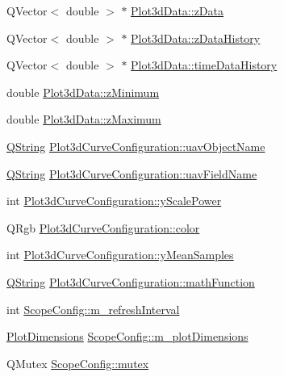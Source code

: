 \begin{DoxyCompactItemize}
\item 
\-Q\-Vector$<$ double $>$ $\ast$ \hyperlink{group___scope_plugin_gad5607d9145f51871817c4094cd1ba250}{\-Plot3d\-Data\-::z\-Data}
\item 
\-Q\-Vector$<$ double $>$ $\ast$ \hyperlink{group___scope_plugin_gab1e0ead20c4c64f78a8dafc2ae101710}{\-Plot3d\-Data\-::z\-Data\-History}
\item 
\-Q\-Vector$<$ double $>$ $\ast$ \hyperlink{group___scope_plugin_ga92914eba20188371aeb3ad365c01acc4}{\-Plot3d\-Data\-::time\-Data\-History}
\item 
double \hyperlink{group___scope_plugin_ga0938aa53ec304cabf25b8294dde0a5b0}{\-Plot3d\-Data\-::z\-Minimum}
\item 
double \hyperlink{group___scope_plugin_ga1ad4417e8b0fb7035d1f4c85191812a0}{\-Plot3d\-Data\-::z\-Maximum}
\item 
\hyperlink{group___u_a_v_objects_plugin_gab9d252f49c333c94a72f97ce3105a32d}{\-Q\-String} \hyperlink{group___scope_plugin_gae997da1be9b0e82a84d8d19292c28984}{\-Plot3d\-Curve\-Configuration\-::uav\-Object\-Name}
\item 
\hyperlink{group___u_a_v_objects_plugin_gab9d252f49c333c94a72f97ce3105a32d}{\-Q\-String} \hyperlink{group___scope_plugin_ga16c893aa5d7da613ba51f6bd7bf70fc8}{\-Plot3d\-Curve\-Configuration\-::uav\-Field\-Name}
\item 
int \hyperlink{group___scope_plugin_gafedb70e83328587c7a6e336f7899a247}{\-Plot3d\-Curve\-Configuration\-::y\-Scale\-Power}
\item 
\-Q\-Rgb \hyperlink{group___scope_plugin_gab12e6f531f6e4242ccbb585aec40b245}{\-Plot3d\-Curve\-Configuration\-::color}
\item 
int \hyperlink{group___scope_plugin_ga917daaa3cc944ff8bd9e8ae6ed1cfc3b}{\-Plot3d\-Curve\-Configuration\-::y\-Mean\-Samples}
\item 
\hyperlink{group___u_a_v_objects_plugin_gab9d252f49c333c94a72f97ce3105a32d}{\-Q\-String} \hyperlink{group___scope_plugin_ga344f163230a632804af76085d5ed4ae1}{\-Plot3d\-Curve\-Configuration\-::math\-Function}
\item 
int \hyperlink{group___scope_plugin_gab29cf33842cdb51f7eba8bfccc93158e}{\-Scope\-Config\-::m\-\_\-refresh\-Interval}
\item 
\hyperlink{group___scope_plugin_ga51d68dee7f98e408c8929a70cc78931d}{\-Plot\-Dimensions} \hyperlink{group___scope_plugin_ga5e011996b5bbb5da0ee8b193bb5073df}{\-Scope\-Config\-::m\-\_\-plot\-Dimensions}
\item 
\-Q\-Mutex \hyperlink{group___scope_plugin_ga482a0dd2b656ddf480def36bacca8aac}{\-Scope\-Config\-::mutex}
\end{DoxyCompactItemize}


